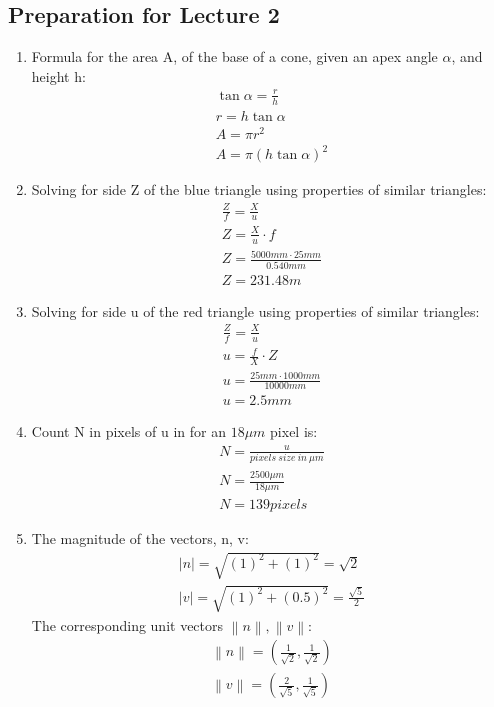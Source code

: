 \documentclass{article}
\begin{document}
\subsection{Preparation for Lecture 2}
\begin{enumerate}
\item
Formula for the area A, of the base of a cone, given an apex angle \( \alpha \), and height h:
\begin{eqnarray*}
\tan \alpha =\frac{r}{h}
\\r=h \tan\alpha
\\A=\pi r^{2}
\\A=\pi\left ( h\tan\alpha \right )^{2}
\end{eqnarray*}

\item
Solving for side Z of the blue triangle using properties of similar triangles:
\begin{eqnarray*}
\frac{Z}{f}=\frac{X}{u}
\\Z=\frac{X}{u}\cdot f
\\Z=\frac{5000 mm \cdot 25 mm}{0.540 mm}
\\Z=231.48m
\end{eqnarray*}

\item
Solving for side u of the red triangle using properties of similar triangles:
\begin{eqnarray*}
\frac{Z}{f}=\frac{X}{u}
\\u=\frac{f}{X}\cdot Z
\\u=\frac{25 mm \cdot 1000 mm}{10000 mm}
\\u=2.5 mm
\end{eqnarray*}

\item
Count N in pixels of u in for an \(18 \mu m\) pixel is:
\begin{eqnarray*}
N=\frac{u}{pixels\:size\:in\:\mu m}
\\N=\frac{2500 \mu m}{18 \mu m}
\\N=139 pixels
\end{eqnarray*}

\item
The magnitude of the vectors, n, v:
\begin{eqnarray*}
\left | n \right |=\sqrt{\left( 1\right )^{2}+\left( 1\right )^{2}}=\sqrt{2}
\\\left | v \right |=\sqrt{\left( 1\right )^{2}+\left( 0.5\right )^{2}}=\frac{\sqrt{5}}{2}
\end{eqnarray*}
\newline
The corresponding unit vectors \(\left \| n \right \|, \left \| v \right \|\):
\begin{eqnarray*}
\left \| n \right \|=(\frac{1}{\sqrt{2}},\frac{1}{\sqrt{2}})
\\\left \| v \right \|=( \frac{2}{\sqrt{5}}, \frac{1}{\sqrt{5}} )
\end{eqnarray*}


\end{enumerate}
\end{document}
